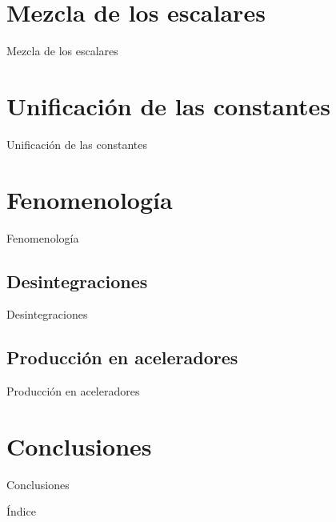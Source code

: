 \documentclass{beamer}
\begin{document}
\section{Mezcla de los escalares}
\begin{frame}[t]{Mezcla de los escalares}

\end{frame}

\section{Unificación de las constantes}
\begin{frame}[t]{Unificación de las constantes}

\end{frame}

\section{Fenomenología}
\begin{frame}[t]{Fenomenología}

\end{frame}

\subsection{Desintegraciones}
\begin{frame}[t]{Desintegraciones}

\end{frame}

\subsection{Producción en aceleradores}
\begin{frame}[t]{Producción en aceleradores}

\end{frame}

\section{Conclusiones}
\begin{frame}[t]{Conclusiones}

\end{frame}

\begin{frame}[t]{Índice}
\tableofcontents
\end{frame}
\end{document}
